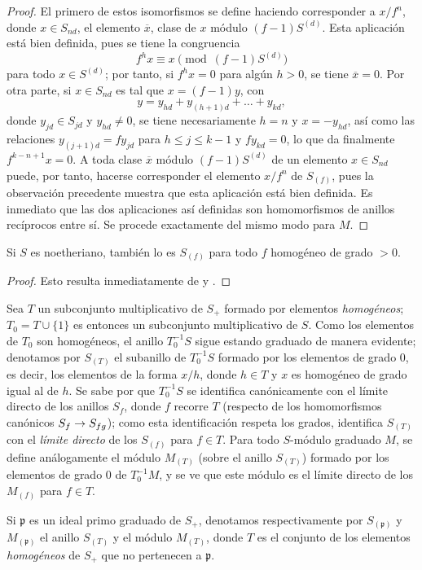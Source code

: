 \documentclass[oneside,10pt]{amsart}
\makeatletter
\renewcommand{\leq}{\leqslant}
\newcommand{\ega@arrow}[2]{\mathchoice{#1}{#2}{#2}{#2}}
\renewcommand{\to}{\ega@arrow{\longrightarrow}{\rightarrow}}
\newcommand{\oldpage}[2][]{\marginnote{\normalfont\footnotesize\textbf{#1}~|~#2}\ignorespaces}
\let\EGAOriginalLabel\label
\renewcommand{\label}[1]{\phantomsection\EGAOriginalLabel{#1}}
\makeatother
\begin{document}
\begin{proof}
El primero de estos isomorfismos se define haciendo corresponder a $x/f^n$, donde $x\in S_{nd}$, el elemento $\overline{x}$, clase de $x$ módulo $(f-1)S^{(d)}$.
Esta aplicación está bien definida, pues se tiene la congruencia
\[
  f^hx\equiv x\pmod{(f-1)S^{(d)}}
\]
para todo $x\in S^{(d)}$; por tanto, si $f^hx=0$ para algún $h>0$,
\oldpage[II]{25}
se tiene $\overline{x}=0$.
Por otra parte, si $x\in S_{nd}$ es tal que $x=(f-1)y$, con
\[
  y=y_{hd}+y_{(h+1)d}+\ldots+y_{kd},
\]
donde $y_{jd}\in S_{jd}$ y $y_{hd}\neq0$, se tiene necesariamente $h=n$ y $x=-y_{hd}$, así como las relaciones $y_{(j+1)d}=fy_{jd}$ para $h\leq j\leq k-1$ y $fy_{kd}=0$, lo que da finalmente $f^{k-n+1}x=0$.
A toda clase $\overline{x}$ módulo $(f-1)S^{(d)}$ de un elemento $x\in S_{nd}$ puede, por tanto, hacerse corresponder el elemento $x/f^n$ de $S_{(f)}$, pues la observación precedente muestra que esta aplicación está bien definida.
Es inmediato que las dos aplicaciones así definidas son homomorfismos de anillos recíprocos entre sí.
Se procede exactamente del mismo modo para $M$.
\end{proof}

\begin{corollary}[2.2.6]
\label{II.2.2.6}
Si $S$ es noetheriano, también lo es $S_{(f)}$ para todo $f$ homogéneo de grado $>0$.
\end{corollary}

\begin{proof}
Esto resulta inmediatamente de  y .
\end{proof}

\begin{env}[2.2.7]
\label{II.2.2.7}
Sea $T$ un subconjunto multiplicativo de $S_+$ formado por elementos \emph{homogéneos}; $T_0=T\cup\{1\}$ es entonces un subconjunto multiplicativo de $S$.
Como los elementos de $T_0$ son homogéneos, el anillo $T_0^{-1}S$ sigue estando graduado de manera evidente; denotamos por $S_{(T)}$ el subanillo de $T_0^{-1}S$ formado por los elementos de grado $0$, es decir, los elementos de la forma $x/h$, donde $h\in T$ y $x$ es homogéneo de grado igual al de $h$.
Se sabe por  que $T_0^{-1}S$ se identifica canónicamente con el límite directo de los anillos $S_f$, donde $f$ recorre $T$ (respecto de los homomorfismos canónicos $S_f\to S_{fg}$); como esta identificación respeta los grados, identifica $S_{(T)}$ con el \emph{límite directo} de los $S_{(f)}$ para $f\in T$.
Para todo $S$-módulo graduado $M$, se define análogamente el módulo $M_{(T)}$ (sobre el anillo $S_{(T)}$) formado por los elementos de grado $0$ de $T_0^{-1}M$, y se ve que este módulo es el límite directo de los $M_{(f)}$ para $f\in T$.

Si $\mathfrak{p}$ es un ideal primo graduado de $S_+$, denotamos respectivamente por $S_{(\mathfrak{p})}$ y $M_{(\mathfrak{p})}$ el anillo $S_{(T)}$ y el módulo $M_{(T)}$, donde $T$ es el conjunto de los elementos \emph{homogéneos} de $S_+$ que no pertenecen a $\mathfrak{p}$.
\end{env}
\end{document}
